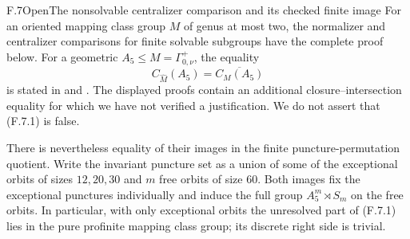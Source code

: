 \begin{claim}{F.7}{Open}{The nonsolvable centralizer comparison and its checked finite image}
For an oriented mapping class group $M$ of genus at most two,
the normalizer and centralizer comparisons for finite solvable
subgroups have the complete proof below. For a geometric
$A_5\le M=\Gamma^+_{0,\nu}$, the equality
\[
                 C_{\widehat M}(A_5)
                    =\overline{C_M(A_5)}                 \tag{F.7.1}
\]
is stated in \cite[Theorem~C(iii)]{R-Boggi} and
\cite[Theorem~5.1(iii)]{R-BZ}. The displayed proofs contain
an additional closure--intersection equality for which we
have not verified a justification. We do not assert that
(F.7.1) is false.

There is nevertheless equality of their images in the
finite puncture-permutation quotient. Write the invariant
puncture set as a union of some of the exceptional orbits
of sizes $12,20,30$ and $m$ free orbits of size $60$.
Both images fix the exceptional punctures individually
and induce the full group $A_5^m\rtimes S_m$ on the
free orbits. In particular, with only exceptional orbits
the unresolved part of (F.7.1) lies in the pure profinite
mapping class group; its discrete right side is trivial.
\end{claim}
